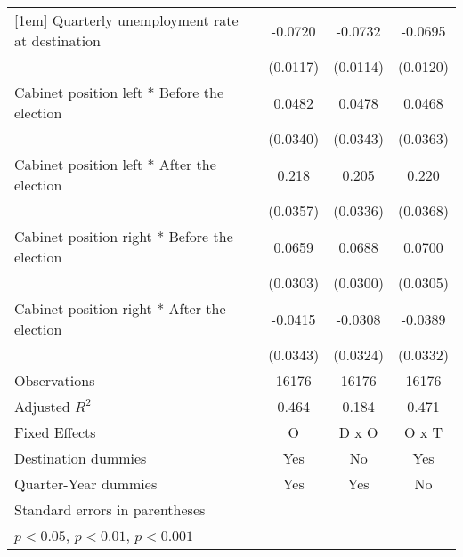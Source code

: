 \begin{table}[htbp]
\begin{tabular}{l*{3}{c}}
[1em]
Quarterly unemployment rate at destination&     -0.0720\sym{***}&     -0.0732\sym{***}&     -0.0695\sym{***}\\
                    &    (0.0117)         &    (0.0114)         &    (0.0120)         \\
[1em]
Cabinet position left * Before the election&      0.0482         &      0.0478         &      0.0468         \\
                    &    (0.0340)         &    (0.0343)         &    (0.0363)         \\
[1em]
Cabinet position left * After the election&       0.218\sym{***}&       0.205\sym{***}&       0.220\sym{***}\\
                    &    (0.0357)         &    (0.0336)         &    (0.0368)         \\
[1em]
Cabinet position right * Before the election&      0.0659\sym{*}  &      0.0688\sym{*}  &      0.0700\sym{*}  \\
                    &    (0.0303)         &    (0.0300)         &    (0.0305)         \\
[1em]
Cabinet position right * After the election&     -0.0415         &     -0.0308         &     -0.0389         \\
                    &    (0.0343)         &    (0.0324)         &    (0.0332)         \\
\hline
Observations        &       16176         &       16176         &       16176         \\
Adjusted \(R^{2}\)  &       0.464         &       0.184         &       0.471         \\
Fixed Effects       &           O         &       D x O         &       O x T         \\
Destination dummies &         Yes         &          No         &         Yes         \\
Quarter-Year dummies&         Yes         &         Yes         &          No         \\
\hline\hline
\multicolumn{4}{l}{\footnotesize Standard errors in parentheses}\\
\multicolumn{4}{l}{\footnotesize \sym{*} \(p<0.05\), \sym{**} \(p<0.01\), \sym{***} \(p<0.001\)}\\
\end{tabular}
\end{table}
